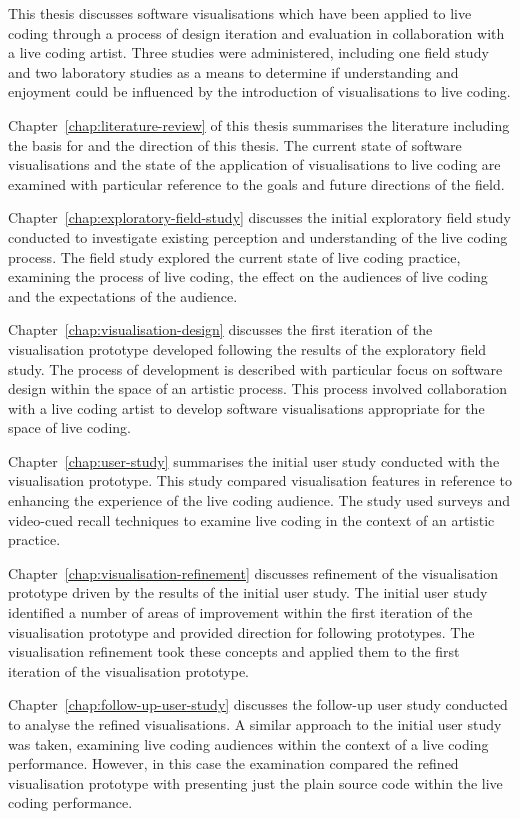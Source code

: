 This thesis discusses software visualisations which have been applied to live coding through a process of design iteration and evaluation in collaboration with a live coding artist. Three studies were administered, including one field study and two laboratory studies as a means to determine if understanding and enjoyment could be influenced by the introduction of visualisations to live coding.

Chapter~\ref{chap:literature-review} of this thesis summarises the literature including the basis for and the direction of this thesis. The current state of software visualisations and the state of the application of visualisations to live coding are examined with particular reference to the goals and future directions of the field.

Chapter~\ref{chap:exploratory-field-study} discusses the initial exploratory field study conducted to investigate existing perception and understanding of the live coding process. The field study explored the current state of live coding practice, examining the process of live coding, the effect on the audiences of live coding and the expectations of the audience.

Chapter~\ref{chap:visualisation-design} discusses the first iteration of the visualisation prototype developed following the results of the exploratory field study. The process of development is described with particular focus on software design within the space of an artistic process. This process involved collaboration with a live coding artist to develop software visualisations appropriate for the space of live coding.

Chapter~\ref{chap:user-study} summarises the initial user study conducted with the visualisation prototype. This study compared visualisation features in reference to enhancing the experience of the live coding audience. The study used surveys and video-cued recall techniques to examine live coding in the context of an artistic practice.

Chapter~\ref{chap:visualisation-refinement} discusses refinement of the visualisation prototype driven by the results of the initial user study. The initial user study identified a number of areas of improvement within the first iteration of the visualisation prototype and provided direction for following prototypes. The visualisation refinement took these concepts and applied them to the first iteration of the visualisation prototype.

Chapter~\ref{chap:follow-up-user-study} discusses the follow-up user study conducted to analyse the refined visualisations. A similar approach to the initial user study was taken, examining live coding audiences within the context of a live coding performance. However, in this case the examination compared the refined visualisation prototype with presenting just the plain source code within the live coding performance.

